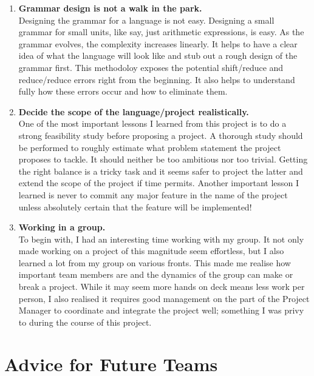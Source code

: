 \documentclass[12pt]{report}
\begin{document}
\begin{enumerate}
\item \textbf{Grammar design is not a walk in the park.}\\
Designing the grammar for a language is not easy. Designing a small grammar for small units, like say, just arithmetic expressions, is easy. As the grammar evolves, the complexity increases linearly. It helps to have a clear idea of what the language will look like and stub out a rough design of the grammar first. This methodoloy exposes the potential shift/reduce and reduce/reduce errors right from the beginning. It also helps to understand fully how these errors occur and how to eliminate them.
\item \textbf{Decide the scope of the language/project realistically.}\\
One of the most important lessons I learned from this project is to do a strong feasibility study before proposing a project. A thorough study should be performed to roughly estimate what problem statement the project proposes to tackle. It should neither be too ambitious nor too trivial. Getting the right balance is a tricky task and it seems safer to project the latter and extend the scope of the project if time permits. Another important lesson I learned is never to commit any major feature in the name of the project unless absolutely certain that the feature will be implemented!
\item \textbf{Working in a group.}\\
To begin with, I had an interesting time working with my group. It not only made working on a project of this magnitude seem effortless, but I also learned a lot from my group on various fronts. This made me realise how important team members are and the dynamics of the group can make or break a project. While it may seem more hands on deck means less work per person, I also realised it requires good management on the part of the Project Manager to coordinate and integrate the project well; something I was privy to during the course of this project.
\end{enumerate}

\section{Advice for Future Teams}
\end{document}

